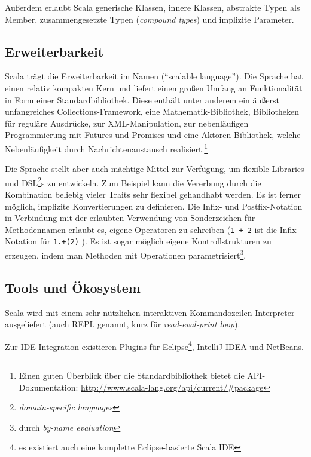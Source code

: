 \documentclass[a4paper, 12pt, hidelinks, listof=totoc, listoftables=totoc, bibliography=totoc]{scrreprt}
\begin{document}
Außerdem erlaubt Scala generische Klassen, innere Klassen, abstrakte Typen als Member, zusammengesetzte Typen (\textit{compound types}) und implizite Parameter.\cite[S. 16 ff., S. 205 ff.]{odersky2008.PIS}\cite[S. 113 ff.]{piepmeyer2010.GFP}\cite{scala-lang2011.CSS}

\subsection{Erweiterbarkeit}

Scala trägt die Erweiterbarkeit im Namen ("`scalable language"').
Die Sprache hat einen relativ kompakten Kern und liefert einen großen Umfang an Funktionalität in Form einer Standardbibliothek. Diese enthält unter anderem ein äußerst unfangreiches Collections-Framework, eine Mathematik-Bibliothek, Bibliotheken für reguläre Ausdrücke, zur XML-Manipulation, zur nebenläufigen Programmierung mit Futures und Promises und eine Aktoren-Bibliothek, welche Nebenläufigkeit durch Nachrichtenaustausch realisiert.\footnote{Einen guten Überblick über die Standardbibliothek bietet die API-Dokumentation: \url{http://www.scala-lang.org/api/current/\#package}}

Die Sprache stellt aber auch mächtige Mittel zur Verfügung, um flexible Libraries und DSL\footnote{\textit{domain-specific languages}}s zu entwickeln. Zum Beispiel kann die Vererbung durch die Kombination beliebig vieler Traits sehr flexibel gehandhabt werden. Es ist ferner möglich, implizite Konvertierungen zu definieren. Die Infix- und Postfix-Notation in Verbindung mit der erlaubten Verwendung von Sonderzeichen für Methodennamen erlaubt es, eigene Operatoren zu schreiben (\texttt{1 + 2} ist die Infix-Notation für \texttt{1.+(2)} ). Es ist sogar möglich eigene Kontrollstrukturen zu erzeugen, indem man Methoden mit Operationen parametrisiert\footnote{
	durch \textit{by-name evaluation}}.\cite[S. 4 ff.]{odersky2008.PIS}

\subsection{Tools und Ökosystem}

Scala wird mit einem sehr nützlichen interaktiven Kommandozeilen-Interpreter ausgeliefert (auch REPL genannt, kurz für \textit{read-eval-print loop}).

Zur IDE-Integration existieren Plugins für Eclipse\footnote{
	es existiert auch eine komplette Eclipse-basierte Scala IDE}, 
IntelliJ IDEA und NetBeans.
\end{document}
